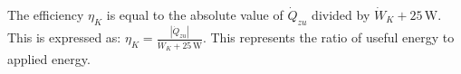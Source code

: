 The efficiency \( \eta_{K} \) is equal to the absolute value of \( \dot{Q}_{zu} \) divided by \( \dot{W}_{K} + 25 \, \text{W} \). This is expressed as:  
\( \eta_{K} = \frac{|\dot{Q}_{zu}|}{\dot{W}_{K} + 25 \, \text{W}} \).  
This represents the ratio of useful energy to applied energy.